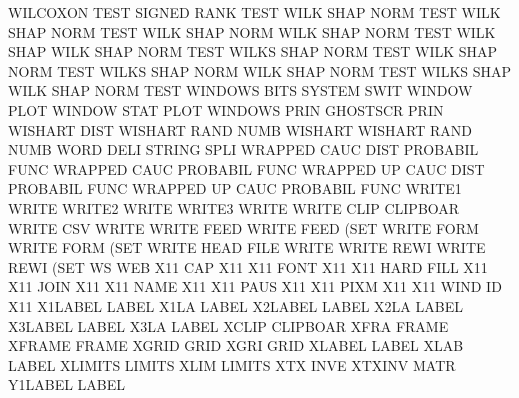 WILCOXON TEST                           SIGNED   RANK TEST
WILK     SHAP NORM TEST                 WILK     SHAP NORM TEST
WILK     SHAP NORM                      WILK     SHAP NORM TEST
WILK     SHAP                           WILK     SHAP NORM TEST
WILKS    SHAP NORM TEST                 WILK     SHAP NORM TEST
WILKS    SHAP NORM                      WILK     SHAP NORM TEST
WILKS    SHAP                           WILK     SHAP NORM TEST
WINDOWS  BITS                           SYSTEM   SWIT
WINDOW   PLOT                           WINDOW   STAT PLOT
WINDOWS  PRIN                           GHOSTSCR PRIN
WISHART  DIST                           WISHART  RAND NUMB
WISHART                                 WISHART  RAND NUMB
WORD     DELI                           STRING   SPLI
WRAPPED  CAUC DIST                      PROBABIL FUNC
WRAPPED  CAUC                           PROBABIL FUNC
WRAPPED  UP   CAUC DIST                 PROBABIL FUNC
WRAPPED  UP   CAUC                      PROBABIL FUNC
WRITE1                                  WRITE
WRITE2                                  WRITE
WRITE3                                  WRITE
WRITE    CLIP                           CLIPBOAR
WRITE    CSV                            WRITE
WRITE    FEED                           WRITE    FEED (SET
WRITE    FORM                           WRITE    FORM (SET
WRITE    HEAD FILE                      WRITE
WRITE    REWI                           WRITE    REWI (SET
WS                                      WEB
X11      CAP                            X11
X11      FONT                           X11
X11      HARD FILL                      X11
X11      JOIN                           X11
X11      NAME                           X11
X11      PAUS                           X11
X11      PIXM                           X11
X11      WIND ID                        X11
X1LABEL                                 LABEL
X1LA                                    LABEL
X2LABEL                                 LABEL
X2LA                                    LABEL
X3LABEL                                 LABEL
X3LA                                    LABEL
XCLIP                                   CLIPBOAR
XFRA                                    FRAME
XFRAME                                  FRAME
XGRID                                   GRID
XGRI                                    GRID
XLABEL                                  LABEL
XLAB                                    LABEL
XLIMITS                                 LIMITS
XLIM                                    LIMITS
XTX      INVE                           XTXINV   MATR
Y1LABEL                                 LABEL
